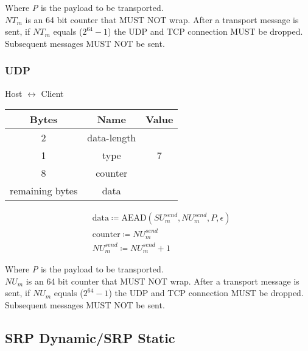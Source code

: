 Where \emph{P} is the payload to be transported.\\

$\mathit{NT}_{m}$ is an 64 bit counter that MUST NOT wrap. After a transport message is sent, if $\mathit{NT}_{m}$ equals
($2^{64}-1$) the UDP and TCP connection MUST be dropped. Subsequent messages MUST NOT be sent. \\

\subsubsection{UDP}

\begin{center}
    Host $\leftrightarrow$ Client\\
    \begin{tabular}{|c|c|c|}
        \hline
        \textbf{Bytes}  & \textbf{Name} & \textbf{Value} \\
        \hline
        2               & data-length   &                \\
        \hline
        1               & type          & 7              \\
        \hline
        8               & counter       &                \\
        \hline
        remaining bytes & data          &                \\
        \hline
    \end{tabular}
\end{center}

\begin{align*}
    & \text{data} \coloneqq \text{AEAD}(\mathit{SU}_{m}^{send},\mathit{NU}_{m}^{send}, P, \epsilon)\\
    & \text{counter} \coloneqq \mathit{NU}_{m}^{send}\\
    & \mathit{NU}_{m}^{send} \coloneqq \mathit{NU}_{m}^{send} + 1
\end{align*}


Where \emph{P} is the payload to be transported.\\

$\mathit{NU}_{m}$ is an 64 bit counter that MUST NOT wrap. After a transport message is sent, if $\mathit{NU}_{m}$ equals
($2^{64}-1$) the UDP and TCP connection MUST be dropped. Subsequent messages MUST NOT be sent. \\

\subsection{SRP Dynamic/SRP Static}

